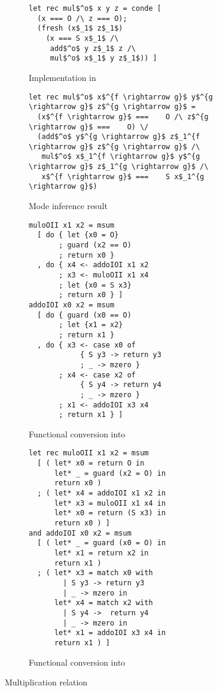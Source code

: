 \begin{figure}[h]
  \centering
  \begin{subfigure}[b]{0.45\textwidth}
    \begin{lstlisting}[frame=tb]
let rec mul$^o$ x y z = conde [
  (x === O /\ z === O);
  (fresh (x$_1$ z$_1$)
    (x === S x$_1$ /\
     add$^o$ y z$_1$ z /\
     mul$^o$ x$_1$ y z$_1$)) ]
    \end{lstlisting}
   \caption{Implementation in \mk}
    \label{fig:mult_mk}
  \end{subfigure}
  \hfill
  \begin{subfigure}[b]{0.45\textwidth}
    \begin{lstlisting}[frame=tb]
let rec mul$^o$ x$^{f \rightarrow g}$ y$^{g \rightarrow g}$ z$^{g \rightarrow g}$ =
  (x$^{f \rightarrow g}$ ===    O /\ z$^{g \rightarrow g}$ ===    O) \/
  (add$^o$ y$^{g \rightarrow g}$ z$_1^{f \rightarrow g}$ z$^{g \rightarrow g}$ /\
   mul$^o$ x$_1^{f \rightarrow g}$ y$^{g \rightarrow g}$ z$_1^{g \rightarrow g}$ /\
   x$^{f \rightarrow g}$ ===    S x$_1^{g \rightarrow g}$)
    \end{lstlisting}
    \caption{Mode inference result}
    \label{fig:mult_modded}
  \end{subfigure}

  \hfill

  \begin{subfigure}[b]{0.45\textwidth}
    \begin{lstlisting}[frame=tb]
muloOII x1 x2 = msum
  [ do { let {x0 = O}
       ; guard (x2 == O)
       ; return x0 }
  , do { x4 <- addoIOI x1 x2
       ; x3 <- muloOII x1 x4
       ; let {x0 = S x3}
       ; return x0 } ]
addoIOI x0 x2 = msum
  [ do { guard (x0 == O)
       ; let {x1 = x2}
       ; return x1 }
  , do { x3 <- case x0 of
            { S y3 -> return y3
            ; _ -> mzero }
       ; x4 <- case x2 of
            { S y4 -> return y4
            ; _ -> mzero }
       ; x1 <- addoIOI x3 x4
       ; return x1 } ]
    \end{lstlisting}
    \caption{Functional conversion into \haskell}
    \label{fig:mult_haskell}
  \end{subfigure}
\hfill
  \begin{subfigure}[b]{0.45\textwidth}
    \begin{lstlisting}[frame=tb]
let rec muloOII x1 x2 = msum
  [ ( let* x0 = return O in
      let* _ = guard (x2 = O) in
      return x0 )
  ; ( let* x4 = addoIOI x1 x2 in
      let* x3 = muloOII x1 x4 in
      let* x0 = return (S x3) in
      return x0 ) ]
and addoIOI x0 x2 = msum
  [ ( let* _ = guard (x0 = O) in
      let* x1 = return x2 in
      return x1 )
  ; ( let* x3 = match x0 with
        | S y3 -> return y3
        | _ -> mzero in
      let* x4 = match x2 with
        | S y4 ->  return y4
        | _ -> mzero in
      let* x1 = addoIOI x3 x4 in
      return x1 ) ]
    \end{lstlisting}
    \caption{Functional conversion into \ocaml}
    \label{fig:mult_ocaml}
  \end{subfigure}

  \caption{Multiplication relation}
  \label{fig:mult}
\end{figure}

